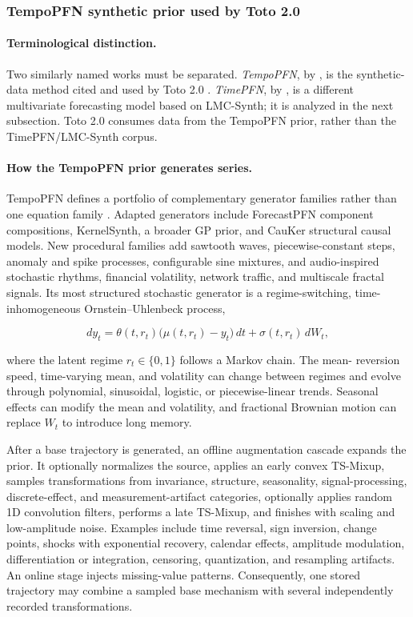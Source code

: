 \subsubsection{TempoPFN synthetic prior used by Toto 2.0}

\paragraph{Terminological distinction.}
Two similarly named works must be separated. \emph{TempoPFN}, by
\citet{moroshan2025tempopfn}, is the synthetic-data method cited and used by
Toto 2.0 \citep{khwaja2026toto2}. \emph{TimePFN}, by
\citet{taga2025timepfn}, is a different multivariate forecasting model based on
LMC-Synth; it is analyzed in the next subsection. Toto 2.0 consumes data from
the TempoPFN prior, rather than the TimePFN/LMC-Synth corpus.

\paragraph{How the TempoPFN prior generates series.}
TempoPFN defines a portfolio of complementary generator families rather than
one equation family \citep{moroshan2025tempopfn}. Adapted generators include
ForecastPFN component compositions, KernelSynth, a broader GP prior, and
CauKer structural causal models. New procedural families add sawtooth waves,
piecewise-constant steps, anomaly and spike processes, configurable sine
mixtures, and audio-inspired stochastic rhythms, financial volatility,
network traffic, and multiscale fractal signals. Its most structured stochastic
generator is a regime-switching, time-inhomogeneous Ornstein--Uhlenbeck process,

\begin{equation}
 d y_t
 =\theta(t,r_t)\bigl(\mu(t,r_t)-y_t\bigr)\,dt
  +\sigma(t,r_t)\,dW_t,
\label{eq:tempopfn-ou}
\end{equation}

where the latent regime $r_t\in\{0,1\}$ follows a Markov chain. The mean-
reversion speed, time-varying mean, and volatility can change between regimes
and evolve through polynomial, sinusoidal, logistic, or piecewise-linear
trends. Seasonal effects can modify the mean and volatility, and fractional
Brownian motion can replace $W_t$ to introduce long memory.

After a base trajectory is generated, an offline augmentation cascade expands
the prior. It optionally normalizes the source, applies an early convex
TS-Mixup, samples transformations from invariance, structure, seasonality,
signal-processing, discrete-effect, and measurement-artifact categories,
optionally applies random 1D convolution filters, performs a late TS-Mixup,
and finishes with scaling and low-amplitude noise. Examples include time
reversal, sign inversion, change points, shocks with exponential recovery,
calendar effects, amplitude modulation, differentiation or integration,
censoring, quantization, and resampling artifacts. An online stage injects
missing-value patterns. Consequently, one stored trajectory may combine a
sampled base mechanism with several independently recorded transformations.

